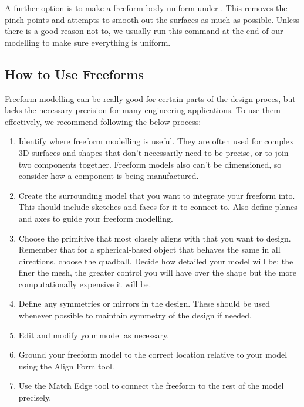 A further option is to make a freeform body uniform under . This removes the pinch points and attempts to smooth out the surfaces as much as possible. Unless there is a good reason not to, we usually run this command at the end of our modelling to make sure everything is uniform.

\subsection{How to Use Freeforms}

Freeform modelling can be really good for certain parts of the design proces, but lacks the necessary precision for many engineering applications. To use them effectively, we recommend following the below process:

\begin{enumerate}

\item
Identify where freeform modelling is useful. They are often used for complex 3D surfaces and shapes that don't necessarily need to be precise, or to join two components together. Freeform models also can't be dimensioned, so consider how a component is being manufactured.

\item
Create the surrounding model that you want to integrate your freeform into. This should include sketches and faces for it to connect to. Also define planes and axes to guide your freeform modelling.

\item
Choose the primitive that most closely aligns with that you want to design. Remember that for a spherical-based object that behaves the same in all directions, choose the quadball. Decide how detailed your model will be: the finer the mesh, the greater control you will have over the shape but the more computationally expensive it will be.

\item
Define any symmetries or mirrors in the design. These should be used whenever possible to maintain symmetry of the design if needed.

\item 
Edit and modify your model as necessary.

\item 
Ground your freeform model to the correct location relative to your model using the Align Form tool.

\item 
Use the Match Edge tool to connect the freeform to the rest of the model precisely.
\end{enumerate}

